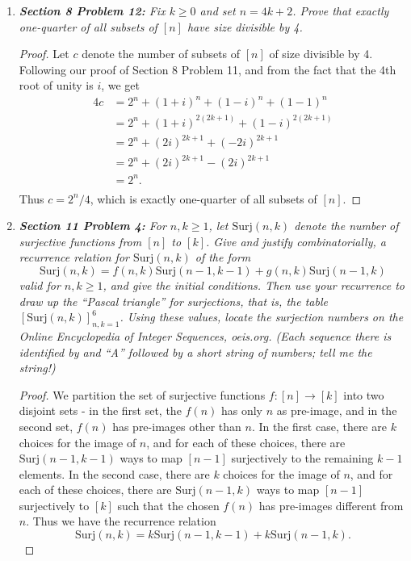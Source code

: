 \documentclass{article}
\begin{document}
\begin{enumerate}[label={\bf Q\arabic*:}]
  \item \it \textbf{Section 8 Problem 12:} Fix $k\geq0$ and set $n=4k+2$.
    Prove that exactly one-quarter of all subsets of $[n]$ have size
    divisible by 4.

    \begin{proof}
      Let $c$ denote the number of subsets of $[n]$ of size divisible by 4.
      Following our proof of Section 8 Problem 11, and from the fact that
      the 4th root of unity is $i$, we get
      \begin{align*}
        4c &=2^n +(1+i)^n +(1-i)^n +(1-1)^n\\
        &=2^n +(1+i)^{2(2k+1)} +(1-i)^{2(2k+1)}\\
        &=2^n +(2i)^{2k+1} +(-2i)^{2k+1}\\
        &=2^n +(2i)^{2k+1} -(2i)^{2k+1}\\
        &=2^n.\\
      \end{align*}
      Thus $c=2^n/4$, which is exactly one-quarter of all subsets of $[n]$.
    \end{proof}

  \item \it \textbf{Section 11 Problem 4:} For $n,k\geq1$, let
    $\text{Surj}(n,k)$ denote the number of surjective functions from $[n]$
    to $[k]$. Give and justify combinatorially, a recurrence relation for
    $\text{Surj}(n,k)$ of the form
    \[\text{Surj}(n,k) =f(n,k)\text{Surj}(n-1,k-1)
    +g(n,k)\text{Surj}(n-1,k)\]
    valid for $n,k\geq1$, and give the initial conditions. Then use your
    recurrence to draw up the ``Pascal triangle'' for surjections, that is,
    the table $[\text{Surj}(n,k)]_{n,k=1}^6$. Using these values, locate
    the surjection numbers on the Online Encyclopedia of Integer Sequences,
    oeis.org. (Each sequence there is identified by and ``A'' followed by a
    short string of numbers; tell me the string!)

    \begin{proof}
      We partition the set of surjective functions $f:[n]\rightarrow[k]$
      into two disjoint sets - in the first set, the $f(n)$ has only $n$ as
      pre-image, and in the second set, $f(n)$ has pre-images other than
      $n$. In the first case, there are $k$ choices for the image of $n$,
      and for each of these choices, there are $\text{Surj}(n-1,k-1)$ ways
      to map $[n-1]$ surjectively to the remaining $k-1$ elements. In the
      second case, there are $k$ choices for the image of $n$, and for each
      of these choices, there are $\text{Surj}(n-1,k)$ ways to map $[n-1]$
      surjectively to $[k]$ such that the chosen $f(n)$ has pre-images
      different from $n$. Thus we have the recurrence relation
      \[\text{Surj}(n,k) =k\text{Surj}(n-1,k-1) +k\text{Surj}(n-1,k).\]


\end{proof}
\end{enumerate}
\end{document}
